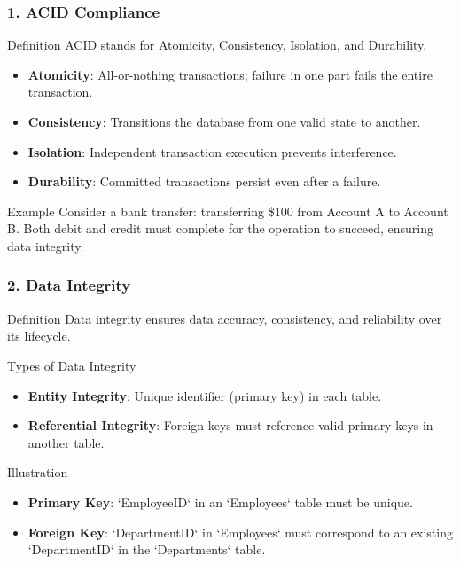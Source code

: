 \documentclass[aspectratio=169]{beamer}
\begin{document}
\begin{frame}[fragile]
    \frametitle{1. ACID Compliance}
    \begin{block}{Definition}
        ACID stands for Atomicity, Consistency, Isolation, and Durability.
        \begin{itemize}
            \item \textbf{Atomicity}: All-or-nothing transactions; failure in one part fails the entire transaction.
            \item \textbf{Consistency}: Transitions the database from one valid state to another.
            \item \textbf{Isolation}: Independent transaction execution prevents interference.
            \item \textbf{Durability}: Committed transactions persist even after a failure.
        \end{itemize}
    \end{block}
    
    \begin{block}{Example}
        Consider a bank transfer: transferring \$100 from Account A to Account B. Both debit and credit must complete for the operation to succeed, ensuring data integrity.
    \end{block}
\end{frame}

\begin{frame}[fragile]
    \frametitle{2. Data Integrity}
    \begin{block}{Definition}
        Data integrity ensures data accuracy, consistency, and reliability over its lifecycle.
    \end{block}
    
    \begin{block}{Types of Data Integrity}
        \begin{itemize}
            \item \textbf{Entity Integrity}: Unique identifier (primary key) in each table.
            \item \textbf{Referential Integrity}: Foreign keys must reference valid primary keys in another table.
        \end{itemize}
    \end{block}
    
    \begin{block}{Illustration}
        \begin{itemize}
            \item \textbf{Primary Key}: `EmployeeID` in an `Employees` table must be unique.
            \item \textbf{Foreign Key}: `DepartmentID` in `Employees` must correspond to an existing `DepartmentID` in the `Departments` table.
        \end{itemize}
    \end{block}
\end{frame}
\end{document}
